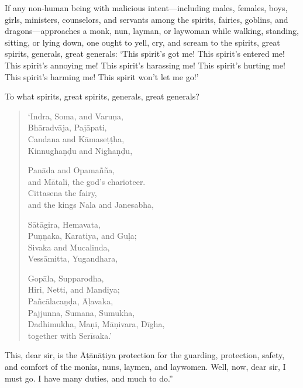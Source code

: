\documentclass[12pt,openany]{book}%
\begin{document}
If any non-human being with malicious intent—including males, females, boys, girls, ministers, counselors, and servants among the spirits, fairies, goblins, and dragons—approaches a monk, nun, layman, or laywoman while walking, standing, sitting, or lying down, one ought to yell, cry, and scream to the spirits, great spirits, generals, great generals: ‘This spirit’s got me! This spirit’s entered me! This spirit’s annoying me! This spirit’s harassing me! This spirit’s hurting me! This spirit’s harming me! This spirit won’t let me go!’ 

To what spirits, great spirits, generals, great generals? 

\begin{verse}%
‘Indra, Soma, and \textsanskrit{Varuṇa}, \\
\textsanskrit{Bhāradvāja}, \textsanskrit{Pajāpati}, \\
Candana and \textsanskrit{Kāmaseṭṭha}, \\
\textsanskrit{Kinnughaṇḍu} and \textsanskrit{Nighaṇḍu}, 

\textsanskrit{Panāda} and \textsanskrit{Opamañña}, \\
and \textsanskrit{Mātali}, the god’s charioteer. \\
Cittasena the fairy, \\
and the kings Nala and Janesabha, 

\textsanskrit{Sātāgira}, Hemavata, \\
\textsanskrit{Puṇṇaka}, Karatiya, and \textsanskrit{Guḷa}; \\
Sivaka and Mucalinda, \\
\textsanskrit{Vessāmitta}, Yugandhara, 

\textsanskrit{Gopāla}, Supparodha, \\
Hiri, Netti, and Mandiya; \\
\textsanskrit{Pañcālacaṇḍa}, \textsanskrit{Āḷavaka}, \\
Pajjunna, Sumana, Sumukha, \\
Dadhimukha, \textsanskrit{Maṇi}, \textsanskrit{Māṇivara}, \textsanskrit{Dīgha}, \\
together with \textsanskrit{Serīsaka}.’ 

%
\end{verse}

This, dear sir, is the \textsanskrit{Āṭānāṭiya} protection for the guarding, protection, safety, and comfort of the monks, nuns, laymen, and laywomen. Well, now, dear sir, I must go. I have many duties, and much to do.” 
\end{document}

